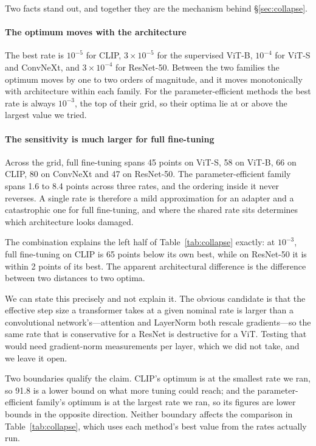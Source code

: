 \documentclass[preprint,12pt]{elsarticle}
\begin{document}
Two facts stand out, and together they are the mechanism behind
\S\ref{sec:collapse}.

\paragraph{The optimum moves with the architecture} The best rate is $10^{-5}$ for
CLIP, $3\times10^{-5}$ for the supervised ViT-B, $10^{-4}$ for ViT-S and ConvNeXt,
and $3\times10^{-4}$ for ResNet-50. Between the two families the optimum moves by
one to two orders of magnitude, and it moves monotonically with architecture
within each family. For the parameter-efficient methods the best rate is always
$10^{-3}$, the top of their grid, so their optima lie at or above the largest
value we tried.

\paragraph{The sensitivity is much larger for full fine-tuning} Across the grid,
full fine-tuning spans 45 points on ViT-S, 58 on ViT-B, 66 on CLIP, 80 on
ConvNeXt and 47 on ResNet-50. The parameter-efficient family spans 1.6 to 8.4
points across three rates, and the ordering inside it never reverses. A single
rate is therefore a mild approximation for an adapter and a catastrophic one for
full fine-tuning, and where the shared rate sits determines which architecture
looks damaged.

The combination explains the left half of Table~\ref{tab:collapse} exactly: at
$10^{-3}$, full fine-tuning on CLIP is 65 points below its own best, while on
ResNet-50 it is within 2 points of its best. The apparent architectural
difference is the difference between two distances to two optima.

We can state this precisely and not explain it. The obvious candidate is that the
effective step size a transformer takes at a given nominal rate is larger than a
convolutional network's---attention and LayerNorm both rescale gradients---so the
same rate that is conservative for a ResNet is destructive for a ViT. Testing
that would need gradient-norm measurements per layer, which we did not take, and
we leave it open.

Two boundaries qualify the claim. CLIP's optimum is at the smallest rate we ran,
so 91.8 is a lower bound on what more tuning could reach; and the
parameter-efficient family's optimum is at the largest rate we ran, so its
figures are lower bounds in the opposite direction. Neither boundary affects the
comparison in Table~\ref{tab:collapse}, which uses each method's best value from
the rates actually run.
\end{document}
